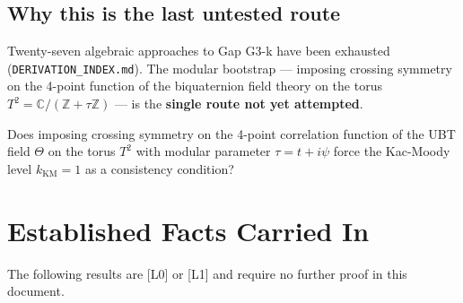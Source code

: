 \documentclass[12pt,a4paper]{article}
\theoremstyle{definition}
\theoremstyle{remark}
\begin{document}
\subsection{Why this is the last untested route}

Twenty-seven algebraic approaches to Gap G3-k have been exhausted
(\texttt{DERIVATION\_INDEX.md}).  The modular bootstrap — imposing crossing
symmetry on the 4-point function of the biquaternion field theory on the torus
$T^2 = \mathbb{C}/(\mathbb{Z}+\tau\mathbb{Z})$ — is the \textbf{single route
not yet attempted}.

\begin{tcolorbox}[colback=blue!4!white,colframe=blue!50!black,
  title=Precise Question for This Document]
Does imposing crossing symmetry on the 4-point correlation function of the
UBT field $\Theta$ on the torus $T^2$ with modular parameter $\tau = t + i\psi$
force the Kac-Moody level $k_{\mathrm{KM}} = 1$ as a consistency condition?
\end{tcolorbox}

\section{Established Facts Carried In}
\label{sec:established}

The following results are [L0] or [L1] and require no further proof in
this document.
\end{document}
